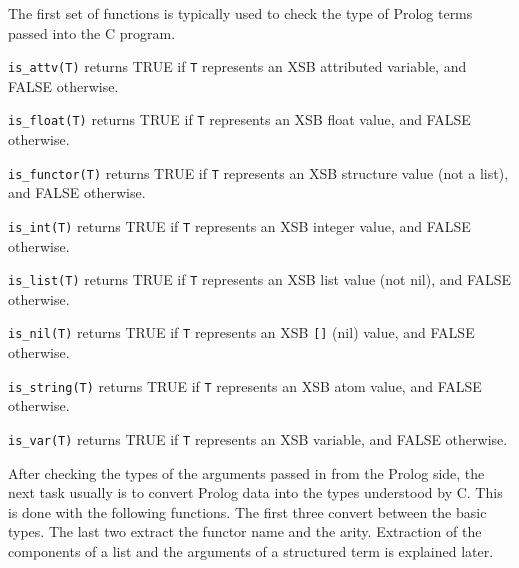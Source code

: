 The first set of functions is typically used to check the type of
Prolog terms passed into the C program. 
\begin{description}
 
    {\tt is\_attv(T)} returns TRUE if {\tt T} represents an XSB
    attributed variable,  and FALSE otherwise.

 
    {\tt is\_float(T)} returns TRUE if {\tt T} represents an XSB
    float value, and FALSE otherwise.

 
    {\tt is\_functor(T)} returns TRUE if {\tt T} represents an
    XSB structure value (not a list), and FALSE otherwise.

 
    {\tt is\_int(T)} returns TRUE if {\tt T} represents an XSB
    integer value, and FALSE otherwise.

 
    {\tt is\_list(T)} returns TRUE if {\tt T} represents an
    XSB list value (not nil), and FALSE otherwise.

 
    {\tt is\_nil(T)} returns TRUE if {\tt T} represents an XSB
    \verb|[]| (nil) value, and FALSE otherwise.

 
    {\tt is\_string(T)} returns TRUE if {\tt T} represents an XSB
    atom value, and FALSE otherwise.

 
    {\tt is\_var(T)} returns TRUE if {\tt T} represents an XSB
    variable, and FALSE otherwise.

\end{description}


After checking the types of the arguments passed in from the Prolog side,
the next task usually is to convert Prolog data into the types understood
by C.  This is done with the following functions. The first three convert
between the basic types. The last two extract the functor name and the
arity.  Extraction of the components of a list and the arguments of a
structured term is explained later.

